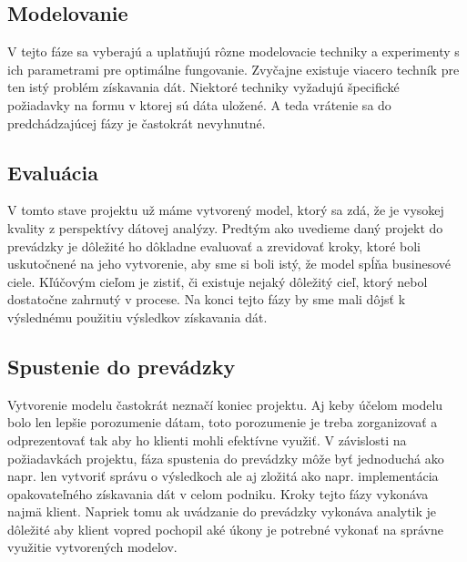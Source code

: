 \subsection{Modelovanie}
V tejto fáze sa vyberajú a uplatňujú rôzne modelovacie techniky a experimenty s ich parametrami pre optimálne fungovanie. Zvyčajne existuje viacero techník pre ten istý problém získavania dát. Niektoré techniky vyžadujú špecifické požiadavky na formu v ktorej sú dáta uložené. A teda vrátenie sa do predchádzajúcej fázy je častokrát nevyhnutné.
\subsection{Evaluácia}
V tomto stave projektu už máme vytvorený model, ktorý sa zdá, že je vysokej kvality z perspektívy dátovej analýzy. Predtým ako uvedieme daný projekt do prevádzky je dôležité ho dôkladne evaluovať a zrevidovať kroky, ktoré boli uskutočnené na jeho vytvorenie, aby sme si boli istý, že model spĺňa businesové ciele. Kľúčovým cieľom je zistiť, či existuje nejaký dôležitý cieľ, ktorý nebol dostatočne zahrnutý v procese. Na konci tejto fázy by sme mali dôjsť k výslednému použitiu výsledkov získavania dát.
\subsection{Spustenie do prevádzky}
Vytvorenie modelu častokrát neznačí koniec projektu. Aj keby účelom modelu bolo len lepšie porozumenie dátam, toto porozumenie je treba zorganizovať a odprezentovať tak aby ho klienti mohli efektívne využiť. V závislosti na požiadavkách projektu, fáza spustenia do prevádzky môže byť jednoduchá ako napr. len vytvoriť správu o výsledkoch ale aj zložitá ako napr. implementácia opakovateľného získavania dát v celom podniku. Kroky tejto fázy vykonáva najmä klient. Napriek tomu ak uvádzanie do prevádzky vykonáva analytik je dôležité aby klient vopred pochopil aké úkony je potrebné vykonať na správne využitie vytvorených modelov.
